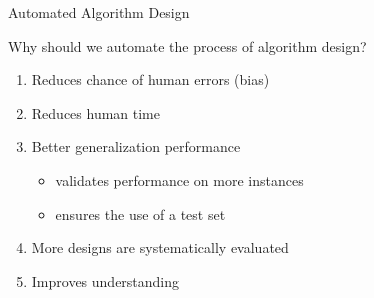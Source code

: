 \begin{frame}[c]{Automated Algorithm Design}

{
\large
Why should we automate the process of algorithm design?
}

\bigskip
\pause

\begin{enumerate}
  \item Reduces chance of human errors (bias)
  \medskip
  \item Reduces human time
  \medskip
  \item Better generalization performance
  \begin{itemize}
  	\item validates performance on more instances
  	\item ensures the use of a test set 
  \end{itemize}
  \smallskip
  \item More designs are systematically evaluated
  \medskip
  \item Improves understanding
\end{enumerate}


\end{frame}
% 
% 
% 
